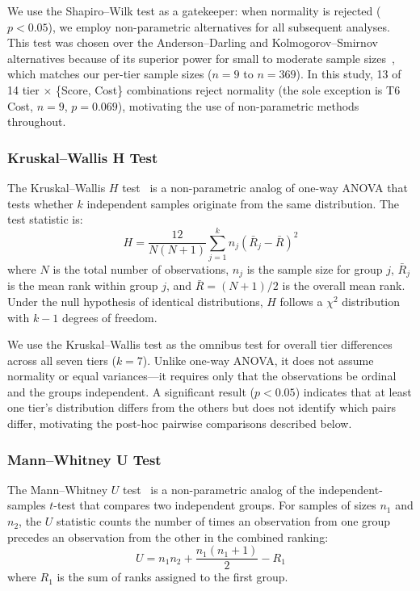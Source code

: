 \documentclass[11pt]{article}
\begin{document}
We use the Shapiro--Wilk test as a gatekeeper: when normality is rejected
($p < 0.05$), we employ non-parametric alternatives for all subsequent
analyses. This test was chosen over the Anderson--Darling and
Kolmogorov--Smirnov alternatives because of its superior power for small to
moderate sample sizes~\cite{razali2011power}, which matches our per-tier
sample sizes ($n = 9$ to $n = 369$). In this study, 13 of 14 tier $\times$
\{Score, Cost\} combinations reject normality (the sole exception is T6 Cost,
$n=9$, $p=0.069$), motivating the use of non-parametric methods throughout.

\subsubsection{Kruskal--Wallis H Test}
\label{sec:kruskal_wallis}

The Kruskal--Wallis $H$ test~\cite{kruskal1952use} is a non-parametric analog
of one-way ANOVA that tests whether $k$ independent samples originate from the
same distribution. The test statistic is:
\begin{equation}
  H = \frac{12}{N(N+1)} \sum_{j=1}^{k} n_j \left(\bar{R}_j - \bar{R}\right)^2
\end{equation}
where $N$ is the total number of observations, $n_j$ is the sample size for
group $j$, $\bar{R}_j$ is the mean rank within group $j$, and $\bar{R} =
(N+1)/2$ is the overall mean rank. Under the null hypothesis of identical
distributions, $H$ follows a $\chi^2$ distribution with $k-1$ degrees of
freedom.

We use the Kruskal--Wallis test as the omnibus test for overall tier
differences across all seven tiers ($k = 7$). Unlike one-way ANOVA, it does
not assume normality or equal variances---it requires only that the
observations be ordinal and the groups independent. A significant result
($p < 0.05$) indicates that at least one tier's distribution differs from the
others but does not identify which pairs differ, motivating the post-hoc
pairwise comparisons described below.

\subsubsection{Mann--Whitney U Test}
\label{sec:mann_whitney}

The Mann--Whitney $U$ test~\cite{mann1947test} is a non-parametric analog of
the independent-samples $t$-test that compares two independent groups. For
samples of sizes $n_1$ and $n_2$, the $U$ statistic counts the number of
times an observation from one group precedes an observation from the other in
the combined ranking:
\begin{equation}
  U = n_1 n_2 + \frac{n_1(n_1+1)}{2} - R_1
\end{equation}
where $R_1$ is the sum of ranks assigned to the first group.
\end{document}
